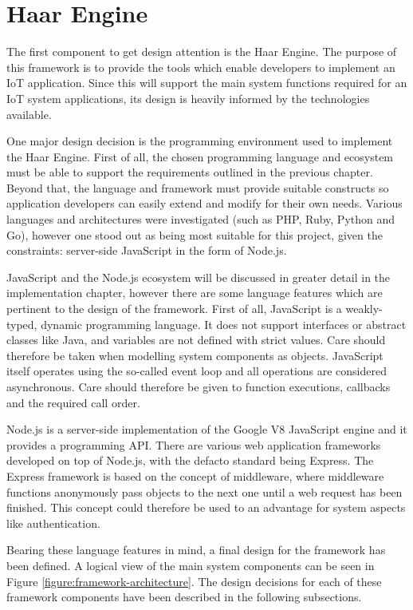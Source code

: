   \section{Haar Engine}
    The first component to get design attention is the Haar Engine. The purpose of this framework is to provide the tools which enable developers to implement an IoT application. Since this will support the main system functions required for an IoT system applications, its design is heavily informed by the technologies available.

    One major design decision is the programming environment used to implement the Haar Engine. First of all, the chosen programming language and ecosystem must be able to support the requirements outlined in the previous chapter. Beyond that, the language and framework must provide suitable constructs so application developers can easily extend and modify for their own needs. Various languages and architectures were investigated (such as PHP, Ruby, Python and Go), however one stood out as being most suitable for this project, given the constraints: server-side JavaScript in the form of Node.js.

    JavaScript and the Node.js ecosystem will be discussed in greater detail in the implementation chapter, however there are some language features which are pertinent to the design of the framework. First of all, JavaScript is a weakly-typed, dynamic programming language. It does not support interfaces or abstract classes like Java, and variables are not defined with strict values. Care should therefore be taken when modelling system components as objects. JavaScript itself operates using the so-called event loop and all operations are considered asynchronous. Care should therefore be given to function executions, callbacks and the required call order.

    Node.js is a server-side implementation of the Google V8 JavaScript engine and it provides a programming API. There are various web application frameworks developed on top of Node.js, with the defacto standard being Express. The Express framework is based on the concept of middleware, where middleware functions anonymously pass objects to the next one until a web request has been finished. This concept could therefore be used to an advantage for system aspects like authentication.

    Bearing these language features in mind, a final design for the framework has been defined. A logical view of the main system components can be seen in Figure \ref{figure:framework-architecture}. The design decisions for each of these framework components have been described in the following subsections.

